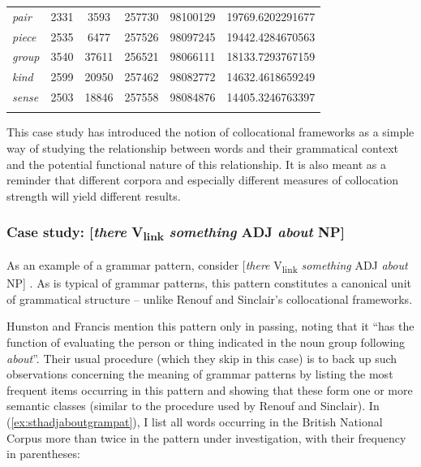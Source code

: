 \begin{table}
{\begin{tabular}[t]{l *{4}{S[table-format=5]} S}
\textit{pair} & 2331 & 3593 & 257730 & 98100129 & 19769.6202291677 \\
\textit{piece} & 2535 & 6477 & 257526 & 98097245 & 19442.4284670563 \\
\textit{group} & 3540 & 37611 & 256521 & 98066111 & 18133.7293767159 \\
\textit{kind} & 2599 & 20950 & 257462 & 98082772 & 14632.4618659249 \\
\textit{sense} & 2503 & 18846 & 257558 & 98084876 & 14405.3246763397 \\
\lspbottomrule
{} \\ %
\end{tabular}}
\end{table}

This case study has introduced the notion of collocational frameworks  as a simple way of studying the relationship between words and their grammatical  context and the potential functional nature of this relationship. It is also meant as a reminder that different corpora and especially different measures of collocation  strength will yield different results.

\subsubsection{Case study: [\textit{there} V\textsubscript{link} \textit{something} ADJ \textit{about} NP]}
\label{sec:itbeadto}

As an example of a grammar pattern,  consider [\textit{there} V\textsubscript{link} \textit{something} ADJ \textit{about} NP] \citep[105--106]{hunston_pattern_2000}. As is typical of grammar patterns, this pattern constitutes a canonical unit of grammatical  structure -- unlike Renouf and Sinclair's collocational   frameworks.

Hunston and Francis mention this pattern only in passing, noting that it ``has the function of evaluating the person or thing indicated in the noun  group following \textit{about}''. Their usual procedure (which they skip in this case) is to back up such observations concerning the meaning of grammar  patterns  by listing the most frequent items occurring in this pattern and showing that these form one or more semantic  classes (similar to the procedure used by Renouf and Sinclair). In (\ref{ex:sthadjaboutgrampat}), I list all words occurring in the British National Corpus more than twice in the pattern under investigation, with their frequency  in parentheses:

